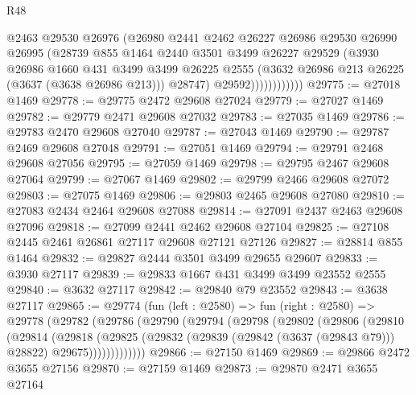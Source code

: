 \begin{lexlean}{R48}
\begin{coremodule}
                        @2463
                        @29530
                        @26976
                        (@26980
                          @2441
                          @2462
                          @26227
                          @26986
                          @29530
                          @26990
                          @26995
                          (@28739
                            @855
                            @1464
                            @2440
                            @3501
                            @3499
                            @26227
                            @29529
                            (@3930
                              @26986
                              @1660
                              @431
                              @3499
                              @3499
                              @26225
                              @2555
                              (@3632 @26986 @213 @26225 (@3637 (@3638 @26986 @213)))
                              @28747)
                            @29592))))))))))))
@29775 := @27018 @1469
@29778 := @29775 @2472 @29608 @27024
@29779 := @27027 @1469
@29782 := @29779 @2471 @29608 @27032
@29783 := @27035 @1469
@29786 := @29783 @2470 @29608 @27040
@29787 := @27043 @1469
@29790 := @29787 @2469 @29608 @27048
@29791 := @27051 @1469
@29794 := @29791 @2468 @29608 @27056
@29795 := @27059 @1469
@29798 := @29795 @2467 @29608 @27064
@29799 := @27067 @1469
@29802 := @29799 @2466 @29608 @27072
@29803 := @27075 @1469
@29806 := @29803 @2465 @29608 @27080
@29810 := @27083 @2434 @2464 @29608 @27088
@29814 := @27091 @2437 @2463 @29608 @27096
@29818 := @27099 @2441 @2462 @29608 @27104
@29825 := @27108 @2445 @2461 @26861 @27117 @29608 @27121 @27126
@29827 := @28814 @855 @1464
@29832 := @29827 @2444 @3501 @3499 @29655 @29607
@29833 := @3930 @27117
@29839 := @29833 @1667 @431 @3499 @3499 @23552 @2555
@29840 := @3632 @27117
@29842 := @29840 @79 @23552
@29843 := @3638 @27117
@29865 := @29774
    (fun (left : @2580) =>
    fun (right : @2580) =>
    @29778
      (@29782
        (@29786
          (@29790
            (@29794
              (@29798
                (@29802
                  (@29806
                    (@29810
                      (@29814
                        (@29818
                          (@29825
                            (@29832
                              (@29839 (@29842 (@3637 (@29843 @79))) @28822)
                              @29675)))))))))))))
@29866 := @27150 @1469
@29869 := @29866 @2472 @3655 @27156
@29870 := @27159 @1469
@29873 := @29870 @2471 @3655 @27164

\end{coremodule}
\end{lexlean}
